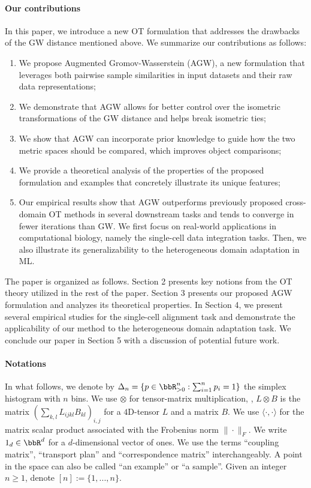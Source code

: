 \paragraph{Our contributions}
In this paper, we introduce a new OT formulation that addresses the drawbacks of the
GW distance mentioned above. We summarize our contributions as follows:
\begin{enumerate}
    \item We propose Augmented Gromov-Wasserstein (AGW), a new formulation that leverages
    both pairwise sample similarities in input datasets and their raw data representations;
    \item We demonstrate that AGW allows for better control over the isometric transformations
    of the GW distance and helps break isometric ties;
    \item We show that AGW can incorporate prior knowledge to guide how the two metric spaces
    should be compared, which improves object comparisons; %
    \item We provide a theoretical analysis of the properties of the proposed formulation
    and examples that concretely illustrate its unique features;
    \item Our empirical results show that AGW outperforms previously proposed
    cross-domain OT methods in several downstream tasks and tends to converge in fewer iterations
    than GW. We first focus on real-world applications in computational biology,
    namely the single-cell data integration tasks. Then, we also illustrate its generalizability
    to the heterogeneous domain adaptation in ML.
\end{enumerate}
The paper is organized as follows. Section 2 presents key notions from the OT theory
utilized in the rest of the paper. Section 3 presents our proposed AGW formulation and
analyzes its theoretical properties. In Section 4, we present several empirical studies
for the single-cell alignment task and demonstrate the applicability of our method to
the heterogeneous domain adaptation task. We conclude our paper in Section 5 with
a discussion of potential future work.

\paragraph{Notations} In what follows, we denote by
$\Delta_{n}=\{ p \in \bbR_{> 0}^n: \sum_{i=1}^{n} p_{i}=1\}$
the simplex histogram with $n$ bins. We use $\otimes$ for tensor-matrix multiplication,
\ie, $L \otimes B$ is the matrix $(\sum_{k,l} L_{ijkl} B_{kl})_{i,j}$ for a $4$D-tensor $L$ and
a matrix $B$. We use $\langle \cdot, \cdot \rangle$ for the matrix scalar product associated with
the Frobenius norm $\|\cdot\|_{F}$. We write $1_d \in \bbR^d$ for a
$d$-dimensional vector of ones. We use the terms ``coupling matrix'', ``transport plan''
and ``correspondence matrix'' interchangeably.
A point in the space can also be called ``an example'' or ``a sample''.
Given an integer $n \geq 1$, denote $[n] := \{ 1, ..., n\}$.

